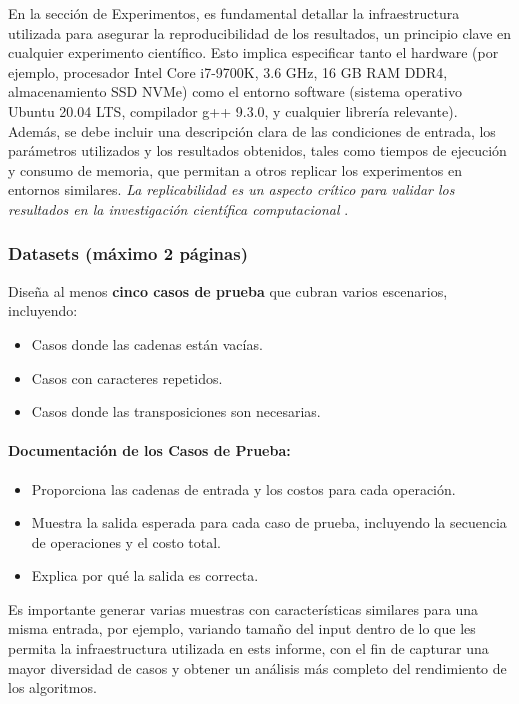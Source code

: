 En la sección de Experimentos, es fundamental detallar la infraestructura utilizada para asegurar la reproducibilidad de los resultados, un principio clave en cualquier experimento científico. Esto implica especificar tanto el hardware (por ejemplo, procesador Intel Core i7-9700K, 3.6 GHz, 16 GB RAM DDR4, almacenamiento SSD NVMe) como el entorno software (sistema operativo Ubuntu 20.04 LTS, compilador g++ 9.3.0, y cualquier librería relevante). Además, se debe incluir una descripción clara de las condiciones de entrada, los parámetros utilizados y los resultados obtenidos, tales como tiempos de ejecución y consumo de memoria, que permitan a otros replicar los experimentos en entornos similares. \textit{La replicabilidad es un aspecto crítico para validar los resultados en la investigación científica computacional} \cite{inbookFonseca}.


\subsubsection{Datasets (máximo 2 páginas)}

Diseña al menos \textbf{cinco casos de prueba} que cubran varios escenarios, incluyendo:
\begin{itemize}
    \item Casos donde las cadenas están vacías.
    \item Casos con caracteres repetidos.
    \item Casos donde las transposiciones son necesarias.
\end{itemize}

\paragraph{Documentación de los Casos de Prueba:}
\begin{itemize}
    \item Proporciona las cadenas de entrada y los costos para cada operación.
    \item Muestra la salida esperada para cada caso de prueba, incluyendo la secuencia de operaciones y el costo total.
    \item Explica por qué la salida es correcta.
\end{itemize}

Es importante generar varias muestras con características similares para una misma entrada, por ejemplo, variando tamaño del input dentro de lo que les permita la infraestructura utilizada en ests informe, con el fin de capturar una mayor diversidad de casos y obtener un análisis más completo del rendimiento de los algoritmos.\\

